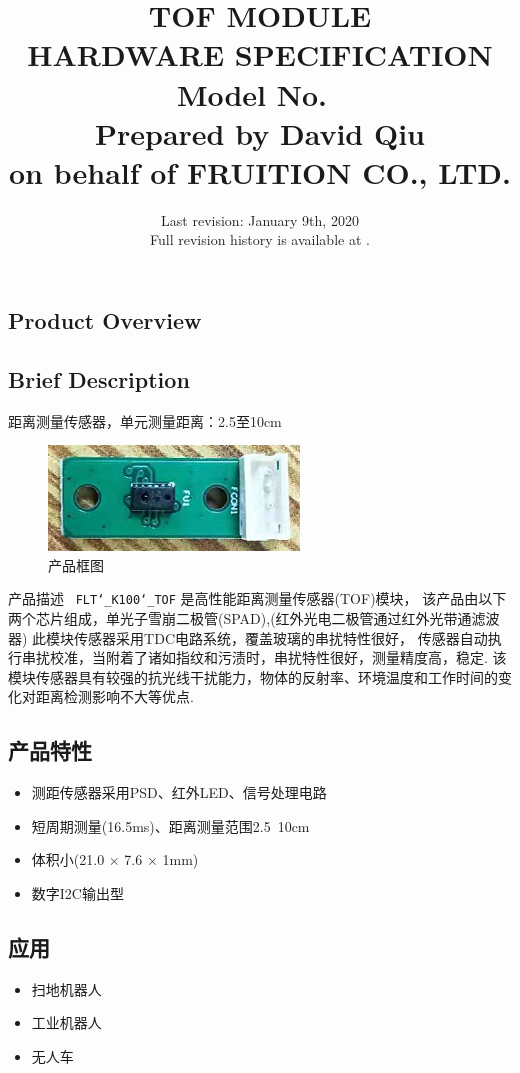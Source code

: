 \documentclass{scrreprt}
\title{
	\flushright
	\Huge{TOF MODULE}\\
	\Huge{HARDWARE SPECIFICATION}\\
	\vspace{2cm}
	\huge{Model No.\ \modelno}\\
	\vspace{2cm}
	\LARGE{Prepared by David Qiu \\ on behalf of FRUITION CO., LTD.}
}
\date{
	Last revision: January 9th, 2020 \\
	Full revision history is available at \upstream.
}
\newcommand{\modelno}{
	\texttt{FLT\char`_K100\char`_TOF}
}
\newcommand{\x}{
	$\times$
}
\begin{document}
\begin{CJK*}{UTF8}{gbsn}
\maketitle
\tableofcontents

\chapter{Product Overview}
\section{Brief Description}
距离测量传感器，单元测量距离：2.5至10cm

\begin{figure}[H]
\center\includegraphics{tof-picture.png}
\caption{产品框图}
\end{figure}

产品描述\ \modelno 是高性能距离测量传感器(TOF)模块，
该产品由以下两个芯片组成，单光子雪崩二极管(SPAD),(红外光电二极管通过红外光带通滤波器)
此模块传感器采用TDC电路系统，覆盖玻璃的串扰特性很好，
传感器自动执行串扰校准，当附着了诸如指纹和污渍时，串扰特性很好，测量精度高，稳定.
该模块传感器具有较强的抗光线干扰能力，物体的反射率、环境温度和工作时间的变化对距离检测影响不大等优点.

\section{产品特性}
\begin{itemize}
	\item 测距传感器采用PSD、红外LED、信号处理电路
	\item 短周期测量(16.5ms)、距离测量范围2.5~10cm
	\item 体积小(21.0\x7.6\x1mm)
	\item 数字I2C输出型
\end{itemize}

\section{应用}
\begin{itemize}
	\item 扫地机器人
	\item 工业机器人
	\item 无人车
\end{itemize}


\end{CJK*}
\end{document}
